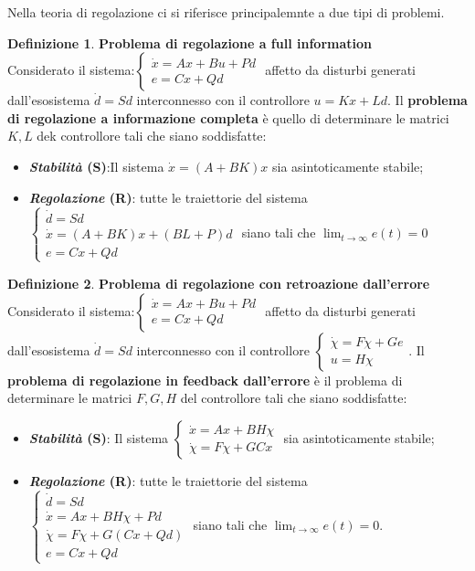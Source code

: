 \documentclass{article}
\theoremstyle{definition}
\newtheorem{definition}{\textbf{Definizione}}
\begin{document}
Nella teoria di regolazione ci si riferisce principalemnte a due tipi di problemi.
\begin{definition}{\textbf{Problema di regolazione a full information}}\\
	Considerato il sistema:\(\begin{cases}
		\dot{x}=Ax+Bu+Pd \\
		e=Cx+Qd
	\end{cases}\) affetto da disturbi generati dall'esosistema \(\dot{d}=Sd\) interconnesso con il controllore \(u=K x+L d\). Il \textbf{problema di regolazione a informazione completa} è quello di determinare le matrici \(K,L\) dek controllore tali che siano soddisfatte:
    \begin{itemize}
		\item \textbf{\emph{Stabilità} (S)}:Il sistema \(\dot{x}=(A+BK)x\) sia asintoticamente stabile;
		\item \textbf{\emph{Regolazione} (R)}: tutte le traiettorie del sistema \(\begin{cases}
			      \dot{d}=Sd              \\
			      \dot{x}=(A+BK)x+(BL+P)d \\
			      e=Cx+Qd
		      \end{cases}\) siano tali che \(\lim_{t\rightarrow\infty}e(t)=0\)
	\end{itemize}
\end{definition}
\begin{definition}{\textbf{Problema di regolazione con retroazione dall'errore}}\\
    Considerato il sistema:\(\begin{cases}
		\dot{x}=Ax+Bu+Pd \\
		e=Cx+Qd
	\end{cases}\) affetto da disturbi generati dall'esosistema \(\dot{d}=Sd\) interconnesso con il controllore \(\begin{cases}
        \dot{\chi}=F\chi + Ge\\
        u=H\chi
    \end{cases}\). Il \textbf{problema di regolazione in feedback dall'errore} è il problema di determinare le matrici \(F,G,H\) del controllore tali che siano soddisfatte:
    \begin{itemize}
        \item \textbf{\emph{Stabilità} (S)}: Il sistema \(\begin{cases}
            \dot{x}=Ax+BH\chi \\
            \dot{\chi}=F\chi+GCx
        \end{cases}\) sia asintoticamente stabile;
        \item \textbf{\emph{Regolazione} (R)}: tutte le traiettorie del sistema \(\begin{cases}
            \dot{d}=Sd\\
            \dot{x}=Ax+BH\chi+Pd \\
            \dot{\chi}=F\chi+G(Cx+Qd)\\
            e=Cx+Qd
        \end{cases}\) siano tali che  \(\lim_{t\rightarrow\infty}e(t)=0\).
    \end{itemize}
\end{definition}
\end{document}
